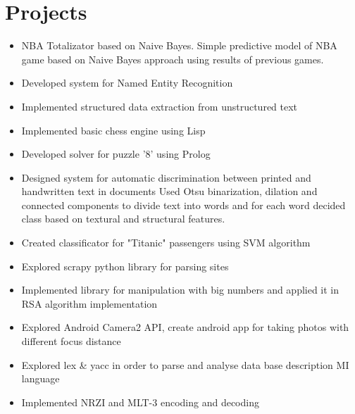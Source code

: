 \documentclass[letterpaper]{twentysecondcv} %
\begin{document}
\section{Projects}
\begin{itemize}
	\item \projectItem
        {NBA Totalizator based on Naive Bayes.}
        {Simple predictive model of NBA game based on Naive Bayes approach using results of previous games.}
	\item \projectItem
        {Developed system for Named Entity Recognition}
        {}
	\item \projectItem
        {Implemented structured data extraction from unstructured text }
        {}
	\item \projectItem
        {Implemented basic chess engine using Lisp }
        {}
    \item \projectItem
        {Developed solver for puzzle '8' using Prolog}
        {}
    \item \projectItem
        {Designed system for automatic discrimination between printed and handwritten text in documents}
        {Used Otsu binarization, dilation and connected components to divide text into words and for each word decided class based on textural and structural features.}
    \item \projectItem
        {Created classificator for "Titanic" passengers using SVM algorithm }
        {}
    \item \projectItem
        {Explored scrapy python library for parsing sites }
        {}
    \item \projectItem
        {Implemented library for manipulation with big numbers and applied it in RSA algorithm implementation}
        {}
    \item \projectItem
        {Explored Android Camera2 API, create android app for taking photos with different focus distance }
        {}
    \item \projectItem
        {Explored lex \& yacc in order to parse and analyse data base description MI language }
        {}
    \item \projectItem
        {Implemented NRZI and MLT-3 encoding and decoding }

\end{itemize}
\end{document}
